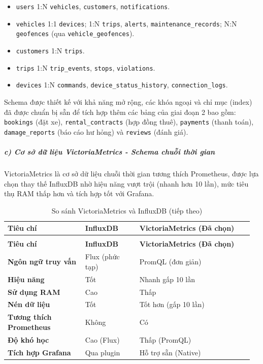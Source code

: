 \documentclass[a4paper]{extarticle}
\newcommand{\thesissettableid}[2]{%
  \renewcommand{\thetable}{#1}%
  \renewcommand{\theHtable}{#2}%
}
\providecommand{\tightlist}{%
  \setlength{\itemsep}{0pt}\setlength{\parskip}{0pt}}
\begin{document}
\begin{itemize}
\tightlist
\item
  \texttt{users} 1:N \texttt{vehicles}, \texttt{customers},
  \texttt{notifications}.
\item
  \texttt{vehicles} 1:1 \texttt{devices}; 1:N \texttt{trips},
  \texttt{alerts}, \texttt{maintenance\_records}; N:N \texttt{geofences}
  (qua \texttt{vehicle\_geofences}).
\item
  \texttt{customers} 1:N \texttt{trips}.
\item
  \texttt{trips} 1:N \texttt{trip\_events}, \texttt{stops},
  \texttt{violations}.
\item
  \texttt{devices} 1:N \texttt{commands}, \texttt{device\_status\_history},
  \texttt{connection\_logs}.
\end{itemize}

Schema được thiết kế với khả năng mở rộng, các khóa ngoại và chỉ mục
(index) đã được chuẩn bị sẵn để tích hợp thêm các bảng của giai đoạn 2 bao gồm:
\texttt{bookings} (đặt xe), \texttt{rental\_contracts} (hợp đồng thuê), \texttt{payments} (thanh
toán), \texttt{damage\_reports} (báo cáo hư hỏng) và \texttt{reviews} (đánh giá).

\subparagraph{c) Cơ sở dữ liệu VictoriaMetrics - Schema chuỗi thời
gian}\label{c-cux1a1-sux1edf-dux1eef-liux1ec7u-victoriametrics---schema-chuux1ed7i-thux1eddi-gian}

VictoriaMetrics là cơ sở dữ liệu chuỗi thời gian tương thích Prometheus,
được lựa chọn thay thế InfluxDB nhờ hiệu năng vượt trội (nhanh hơn 10
lần), mức tiêu thụ RAM thấp hơn và tích hợp tốt với Grafana.


{\thesissettableid{3.20}{tab-ch3-so-sanh-victoriametrics-va-influxdb}
\def\LTcaptype{table}
\begin{longtable}{|L{0.307\linewidth}|L{0.210\linewidth}|L{0.447\linewidth}|}
\caption{So sánh VictoriaMetrics và InfluxDB}\label{tab:ch3-so-sanh-victoriametrics-va-influxdb}\\
\hline \textbf{Tiêu chí} & \textbf{InfluxDB} & \textbf{VictoriaMetrics (Đã chọn)} \\
\hline
\endfirsthead
\caption[]{So sánh VictoriaMetrics và InfluxDB (tiếp theo)}\\
\hline \textbf{Tiêu chí} & \textbf{InfluxDB} & \textbf{VictoriaMetrics (Đã chọn)} \\
\hline
\endhead
\hline
\endfoot
\endlastfoot
\textbf{Ngôn ngữ truy vấn} & Flux (phức tạp) & PromQL (đơn giản) \\\hline
\textbf{Hiệu năng} & Tốt & Nhanh gấp 10 lần \\\hline
\textbf{Sử dụng RAM} & Cao & Thấp \\\hline
\textbf{Nén dữ liệu} & Tốt & Tốt hơn (gấp 10 lần) \\\hline
\textbf{Tương thích Prometheus} & Không & Có \\\hline
\textbf{Độ khó học} & Cao (Flux) & Thấp (PromQL) \\\hline
\textbf{Tích hợp Grafana} & Qua plugin & Hỗ trợ sẵn (Native) \\\hline
\end{longtable}
}
\end{document}
